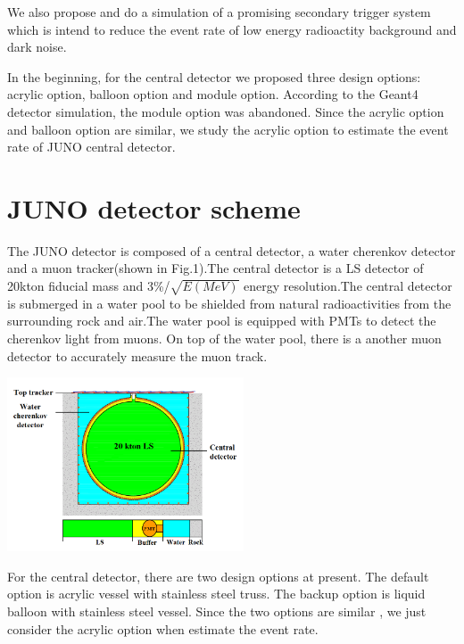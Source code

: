 \documentclass[a4paper,10pt,twoside]{paper}
\begin{document}
\begin{multicols}{2}
		We also propose and do a simulation of a promising secondary trigger system which is intend to
		reduce the event rate of low energy 
		radioactity background and dark noise. 

		In the beginning, for the central detector we proposed
		three design options: acrylic option, balloon option and 
		module option. According to the Geant4 detector simulation,
		the module option was abandoned. Since the acrylic option
		and balloon option are similar, we study the acrylic option
		to estimate the event rate of JUNO central detector.




		\section{JUNO detector scheme}
		The JUNO detector is composed of a central detector, a water
		cherenkov detector and a muon tracker(shown in Fig.1).The 
		central detector is a LS detector of 20kton fiducial mass and
		3\%/$\sqrt{E(MeV)}$ energy resolution.The central detector is
		submerged in a water pool to be shielded from natural 
		radioactivities from the surrounding rock and air.The water pool
		is equipped with PMTs to detect the cherenkov light from muons.
		On top of the water pool, there is a another muon detector to 
		accurately measure the muon track.
		\begin{center}
			\includegraphics[width=7cm]{CD.png}
		\end{center}

		For the central detector, there are two design options at 
		present. The default option is acrylic vessel with stainless
		steel truss. The backup option is liquid balloon with stainless
		steel vessel. Since the two options are similar , we just 
		consider the acrylic option when estimate the event rate.


\end{multicols}
\end{document}
